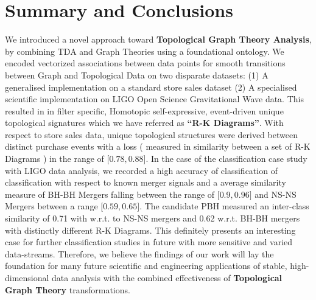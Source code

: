 \section{Summary and Conclusions}

We introduced a novel approach toward \textbf{Topological Graph Theory Analysis}, by combining TDA and Graph Theories using a foundational ontology. We encoded vectorized associations between data points for smooth transitions between Graph and Topological Data on two disparate datasets: (1) A generalised implementation on a standard store sales dataset\cite{TableauSuperStore} (2) A specialised scientific implementation on LIGO Open Science Gravitational Wave data. This resulted in in filter specific, Homotopic self-expressive, event-driven unique topological signatures which we have referred as \textbf{``R-K Diagrams''}. With respect to store sales data, unique topological structures were derived between distinct purchase events with a loss ( measured in similarity between a set of R-K Diagrams ) in the range of $\lbrack0.78, 0.88\rbrack$. In the case of the classification case study with LIGO data analysis, we recorded a high accuracy of classification of classification with respect to known merger signals and a average similarity measure of BH-BH Mergers falling between the range of  $\lbrack0.9, 0.96\rbrack$ and NS-NS Mergers between a range   $\lbrack0.59, 0.65\rbrack$. The candidate PBH measured an inter-class similarity of 0.71 with w.r.t. to NS-NS mergers and 0.62 w.r.t. BH-BH mergers with distinctly different R-K Diagrams. This definitely presents an interesting case for further classification studies in future with more sensitive and varied data-streams. Therefore, we believe the findings of our work will lay the foundation for many future scientific and engineering applications of stable, high-dimensional data analysis with the combined effectiveness of \textbf{Topological Graph Theory} transformations.

